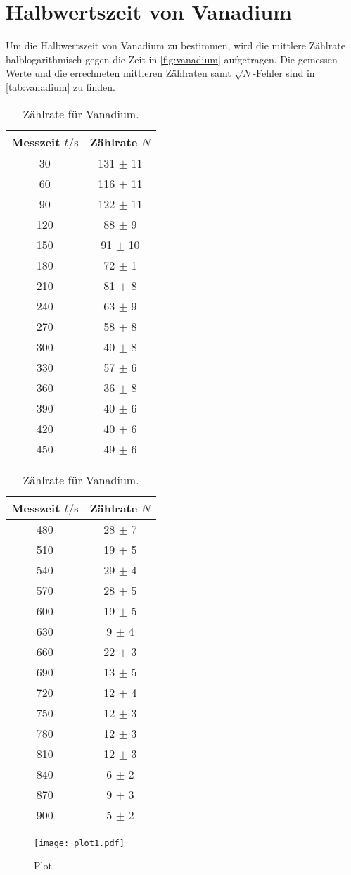 \section{Halbwertszeit von Vanadium}
\label{sec:Vanadium}
Um die Halbwertszeit von Vanadium zu bestimmen, wird die mittlere Zählrate halblogarithmisch gegen die Zeit
in \autoref{fig:vanadium} aufgetragen. Die gemessen Werte und die errechneten mittleren Zählraten samt
$\sqrt{N}$-Fehler sind in \autoref{tab:vanadium} zu finden.
\begin{table}
  \centering
  \begin{tabular}{c c}
    \toprule
    Messzeit $t/\unit{\second}$ & Zählrate $N$\\
    \midrule
     30 & 131 $\pm$ 11 \\
     60 & 116 $\pm$ 11 \\
     90 & 122 $\pm$ 11 \\
    120 &  88 $\pm$  9 \\
    150 &  91 $\pm$ 10 \\
    180 &  72 $\pm$  1 \\
    210 &  81 $\pm$  8 \\
    240 &  63 $\pm$  9 \\
    270 &  58 $\pm$  8 \\
    300 &  40 $\pm$  8 \\
    330 &  57 $\pm$  6 \\
    360 &  36 $\pm$  8 \\
    390 &  40 $\pm$  6 \\
    420 &  40 $\pm$  6 \\
    450 &  49 $\pm$  6 \\
    \bottomrule
  \end{tabular}
  \begin{tabular}{c c}
    \toprule
    Messzeit $t/\unit{\second}$ & Zählrate $N$\\
    \midrule
    480 &  28 $\pm$ 7 \\
    510 &  19 $\pm$ 5 \\
    540 &  29 $\pm$ 4 \\
    570 &  28 $\pm$ 5 \\
    600 &  19 $\pm$ 5 \\
    630 &   9 $\pm$ 4 \\
    660 &  22 $\pm$ 3 \\
    690 &  13 $\pm$ 5 \\
    720 &  12 $\pm$ 4 \\
    750 &  12 $\pm$ 3 \\
    780 &  12 $\pm$ 3 \\
    810 &  12 $\pm$ 3 \\
    840 &   6 $\pm$ 2 \\
    870 &   9 $\pm$ 3 \\
    900 &   5 $\pm$ 2 \\
    \bottomrule
  \end{tabular}
  \caption{Zählrate für Vanadium.}
  \label{tab:vanadium}
\end{table}

\begin{figure}
  \centering
  \texttt{[image: plot1.pdf]}
  \caption{Plot.}
  \label{fig:vanadium}
\end{figure}